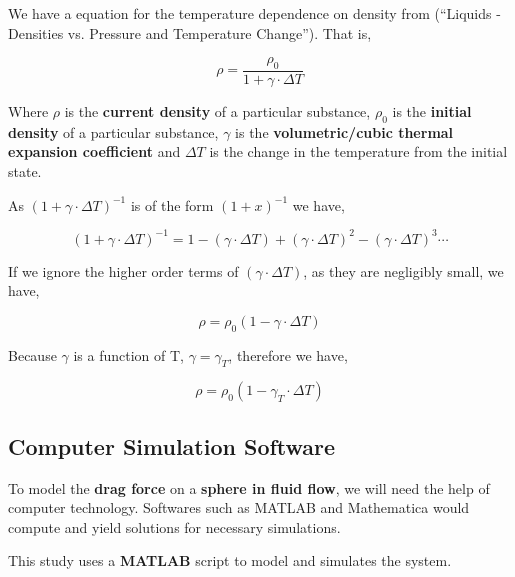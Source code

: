 	{We have a equation for the temperature dependence on density from (“Liquids - Densities vs. Pressure and Temperature Change”). That is,}            
            
		$$\rho = \frac{\rho_{0}}{1 + \gamma\cdot\Delta T}$$            

	{Where $\rho$ is the \textbf{current density} of a particular substance, $\rho_{0}$ is the \textbf{initial density} of a particular substance, $\gamma$ is the \textbf{volumetric/cubic thermal expansion coefficient} and $\Delta T$ is the change in the temperature from the initial state.}            

	{As $\left(1 + \gamma\cdot\Delta T\right)^{-1}$ is of the form $\left(1 + x\right)^{-1}$ we have,}
	
		$$\left(1 + \gamma\cdot\Delta T\right)^{-1} = 1 - \left(\gamma\cdot\Delta T\right) + \left(\gamma\cdot\Delta T\right)^2 - \left(\gamma\cdot\Delta T\right)^3 \cdots$$

	{If we ignore the higher order terms of $\left(\gamma\cdot\Delta T\right)$, as they are negligibly small, we have,}
            
		$$\rho = \rho_{0}\left(1 - \gamma\cdot\Delta T\right)$$            

	{Because $\gamma$ is a function of T, $\gamma = \gamma_{T}$, therefore we have,}

		$$\rho = \rho_{0}\left(1 - \gamma_{T}\cdot\Delta T\right)$$
                      
\subsection{{Computer Simulation Software}}
        
    {To model the \textbf{drag force} on a \textbf{sphere in fluid flow}, we will need the help of computer technology. Softwares such as MATLAB and Mathematica would compute and yield solutions for necessary simulations.}

    {This study uses a \textbf{MATLAB} script to model and simulates the system.}
        
        


